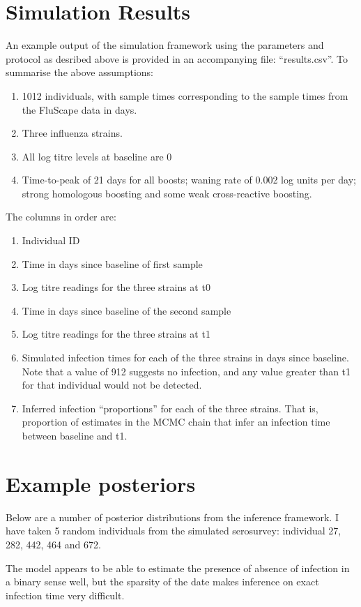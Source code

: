 \documentclass[a4paper,11pt,twoside]{article}
\begin{document}
\section{Simulation Results}
An example output of the simulation framework using the parameters and protocol as desribed above is provided in an accompanying file: ``results.csv''. To summarise the above assumptions:

\begin{enumerate}
\item 1012 individuals, with sample times corresponding to the sample times from the FluScape data in days.
\item Three influenza strains.
\item All log titre levels at baseline are 0
\item Time-to-peak of 21 days for all boosts; waning rate of 0.002 log units per day; strong homologous boosting and some weak cross-reactive boosting.
\end{enumerate}

The columns in order are:
\begin{enumerate}
\item Individual ID
\item Time in days since baseline of first sample
\item Log titre readings for the three strains at t0
\item Time in days since baseline of the second sample
\item Log titre readings for the three strains at t1
\item Simulated infection times for each of the three strains in days since baseline. Note that a value of 912 suggests no infection, and any value greater than t1 for that individual would not be detected.
\item Inferred infection ``proportions'' for each of the three strains. That is, proportion of estimates in the MCMC chain that infer an infection time between baseline and t1.
\end{enumerate}

\newpage
\section{Example posteriors}
Below are a number of posterior distributions from the inference framework. I have taken 5 random individuals from the simulated serosurvey: individual 27, 282, 442, 464 and 672.

The model appears to be able to estimate the presence of absence of infection in a binary sense well, but the sparsity of the date makes inference on exact infection time very difficult.
\end{document}
